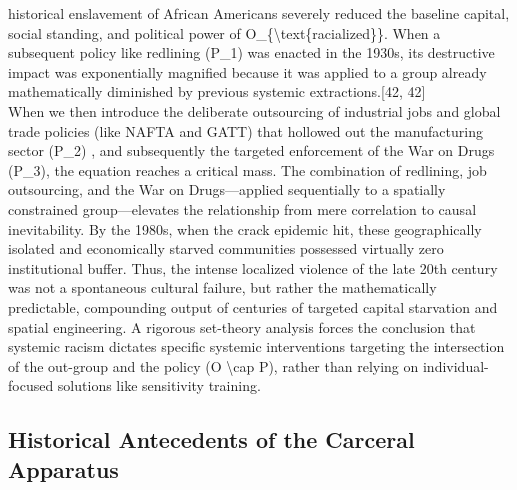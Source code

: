 \documentclass[
]{article}
\begin{document}
historical enslavement of African Americans severely reduced the
baseline capital, social standing, and political power of
O\_\{\textbackslash text\{racialized\}\}. When a subsequent policy like
redlining (P\_1) was enacted in the 1930s, its destructive impact was
exponentially magnified because it was applied to a group already
mathematically diminished by previous systemic extractions.{[}42,
42{]}\\
When we then introduce the deliberate outsourcing of industrial jobs and
global trade policies (like NAFTA and GATT) that hollowed out the
manufacturing sector (P\_2) , and subsequently the targeted enforcement
of the War on Drugs (P\_3), the equation reaches a critical mass. The
combination of redlining, job outsourcing, and the War on
Drugs---applied sequentially to a spatially constrained group---elevates
the relationship from mere correlation to causal inevitability. By the
1980s, when the crack epidemic hit, these geographically isolated and
economically starved communities possessed virtually zero institutional
buffer. Thus, the intense localized violence of the late 20th century
was not a spontaneous cultural failure, but rather the mathematically
predictable, compounding output of centuries of targeted capital
starvation and spatial engineering. A rigorous set-theory analysis
forces the conclusion that systemic racism dictates specific systemic
interventions targeting the intersection of the out-group and the policy
(O \textbackslash cap P), rather than relying on individual-focused
solutions like sensitivity training.

\subsection{\texorpdfstring{\textbf{Historical Antecedents of the
Carceral
Apparatus}}{Historical Antecedents of the Carceral Apparatus}}\label{historical-antecedents-of-the-carceral-apparatus}
\end{document}
